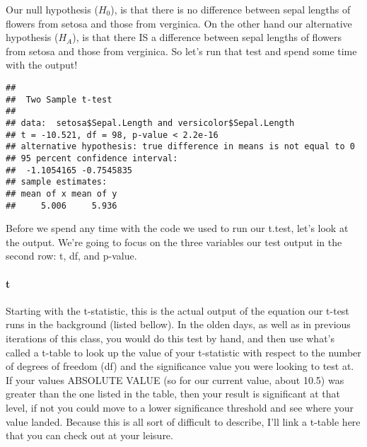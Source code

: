 \documentclass[
]{article}
\newenvironment{Shaded}{\begin{snugshade}}{\end{snugshade}}
\newcommand{\DataTypeTok}[1]{\textcolor[rgb]{0.13,0.29,0.53}{#1}}
\newcommand{\KeywordTok}[1]{\textcolor[rgb]{0.13,0.29,0.53}{\textbf{#1}}}
\newcommand{\NormalTok}[1]{#1}
\newcommand{\OperatorTok}[1]{\textcolor[rgb]{0.81,0.36,0.00}{\textbf{#1}}}
\newcommand{\OtherTok}[1]{\textcolor[rgb]{0.56,0.35,0.01}{#1}}
\newcommand{\StringTok}[1]{\textcolor[rgb]{0.31,0.60,0.02}{#1}}
\begin{document}
Our null hypothesis (\(H_0\)), is that there is no difference between
sepal lengths of flowers from setosa and those from verginica. On the
other hand our alternative hypothesis (\(H_A\)), is that there IS a
difference between sepal lengths of flowers from setosa and those from
verginica. So let's run that test and spend some time with the output!

\begin{Shaded}
\end{Shaded}

\begin{verbatim}
## 
##  Two Sample t-test
## 
## data:  setosa$Sepal.Length and versicolor$Sepal.Length
## t = -10.521, df = 98, p-value < 2.2e-16
## alternative hypothesis: true difference in means is not equal to 0
## 95 percent confidence interval:
##  -1.1054165 -0.7545835
## sample estimates:
## mean of x mean of y 
##     5.006     5.936
\end{verbatim}

Before we spend any time with the code we used to run our t.test, let's
look at the output. We're going to focus on the three variables our test
output in the second row: t, df, and p-value.

\hypertarget{t}{%
\paragraph{t}\label{t}}

Starting with the t-statistic, this is the actual output of the equation
our t-test runs in the background (listed bellow). In the olden days, as
well as in previous iterations of this class, you would do this test by
hand, and then use what's called a t-table to look up the value of your
t-statistic with respect to the number of degrees of freedom (df) and
the significance value you were looking to test at. If your values
ABSOLUTE VALUE (so for our current value, about 10.5) was greater than
the one listed in the table, then your result is significant at that
level, if not you could move to a lower significance threshold and see
where your value landed. Because this is all sort of difficult to
describe, I'll link a t-table here that you can check out at your
leisure.
\end{document}
